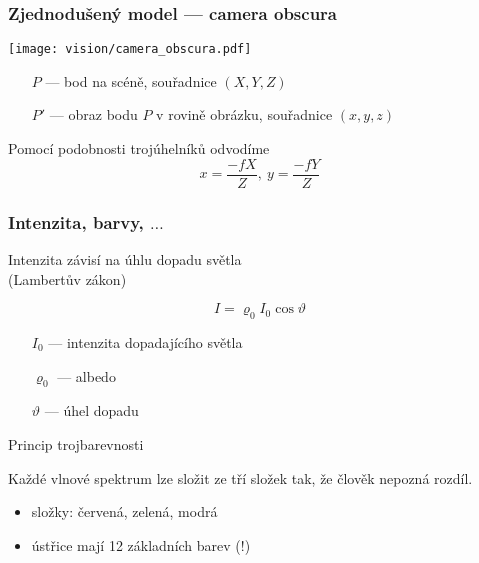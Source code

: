 \documentclass[red,handout,professionalfont]{beamer}
\theoremstyle{definition}
\newcommand{\0}{\mbox{${\bf 0}$}}
\begin{document}
\begin{frame}\frametitle{Zjednodušený model --- camera obscura}
\begin{center}
 \texttt{[image: vision/camera\_obscura.pdf]}
\end{center}\pause
\begin{itemize}
\item[$P$] --- bod na scéně, souřadnice $(X,Y,Z)$\pause
\item[$P'$] --- obraz bodu $P$ v rovině obrázku, souřadnice $(x,y,z)$\pause
\end{itemize}
Pomocí podobnosti trojúhelníků odvodíme\pause
\begin{displaymath}
x=\frac{-fX}{Z},\ y=\frac{-fY}{Z} 
\end{displaymath}
\end{frame}

\begin{frame}\frametitle{Intenzita, barvy, $\ldots$}
\begin{block}{}
\begin{center} 
Intenzita závisí na úhlu dopadu světla\pause\\
(Lambertův zákon)
\end{center}\pause
\end{block}
\begin{displaymath}
 I = \varrho_0I_0\cos\vartheta
\end{displaymath}\pause
\begin{itemize}
\item[$I_0$] --- intenzita dopadajícího světla\pause
\item[$\varrho_0$] --- albedo\pause
\item[$\vartheta$] --- úhel dopadu
\end{itemize}\pause
\begin{block}{}
\begin{center}
Princip trojbarevnosti
\end{center}
\end{block}\pause
\begin{center}
Každé vlnové spektrum lze složit ze tří složek tak, že člověk nepozná rozdíl.
\end{center}\pause

\begin{itemize}
 \item složky: červená, zelená, modrá\pause
 \item ústřice mají 12 základních barev (!)
\end{itemize}
\end{frame}
\end{document}
